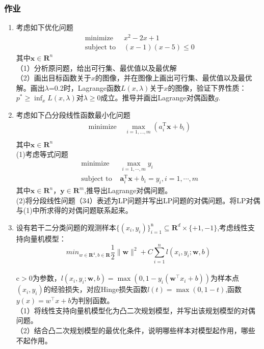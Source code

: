 \documentclass[handout,10pt]{beamer}
\begin{document}
\begin{frame}[allowframebreaks]
  \frametitle{作业}
  
  \begin{enumerate}
  	   \item   考虑如下优化问题
    \begin{equation}
		\begin{array}{ll}
		\text{ minimize }& x^{2}-2x+1\\
		\text { subject to }& (x-1)(x-5)\leqslant0
		\end{array}
	\end{equation}
 其中${\mathbf{x}\in\mathbf{R}^{n}}$\\
（1）分析原问题，给出可行集、最优值以及最优解\\
（2）画出目标函数关于$x$的图像，并在图像上画出可行集、最优值以及最优解。画出${\lambda}$=0.2时，Lagrange函数${L(x,\lambda)}$关于$x$的图像，验证下界性质：${p^*\geqslant\inf_xL(x,\lambda)}$对${\lambda\geqslant0}$成立。推导并画出Lagrange对偶函数$g$.
  	\item 考虑如下凸分段线性函数最小化问题	
   \begin{equation}
		\begin{array}{ll}
		\text{ minimize }&\max_{i=1,\ldots,m}(a_i^\mathrm{T}\boldsymbol{x}+b_i)\\
		\end{array}
	\end{equation}
     其中${\mathbf{x}\in\mathbf{R}^{n}}$\\
(1)考虑等式问题
\begin{equation}
		\begin{array}{ll}
		\text{ minimize }& \max_{i=1,\cdots,m}y_i\\
		\text { subject to }& \boldsymbol{a}_{i}^{\mathrm{T}}\boldsymbol{x}+b_{i}=y_{i},i=1,\cdots,m
		\end{array}
	     \end{equation} 
其中${\mathbf{x}\in\mathbf{R}^{n}}$，${\mathbf{y}\in\mathbf{R}^{m}}$,推导出Lagrange对偶问题。\\

(2)将分段线性问题（34）表述为LP问题并写出LP问题的对偶问题。将LP对偶与(1)中所求得的对偶问题联系起来。 
  	
  	\item 
设有若干二分类问题的观测样本${\{(x_i,y_i)\}_{i=1}^\mathrm{n}\subseteq\mathbf{R}^d\times\{+1,-1\}}$,考虑线性支持向量机模型：\\
\begin{equation}
	min_{w\in\mathbf{R}^{4},b\in\mathbf{R}}\frac{1}{2}\|\boldsymbol{w}\|^{2}+C\sum_{i=1}^{n}l(x_{i},y_{i};\boldsymbol{w},b)
	\end{equation}\\
  ${\mathrm{c}>0}$为参数，${l(x_i,y_i;\boldsymbol{w},b)=\max(0,1-y_i(\boldsymbol{w}^\top x_i+b))}$为样本点${(x_{i},y_{i})}$的经验损失，对应Hinge损失函数${l(t)=\max(0,1-t)}$,函数${y(x)=w^{\top}x+b}$为判别函数。\\
（1）将线性支持向量机模型化为凸二次规划模型，并写出该规划模型的对偶问题。\\
（2）结合凸二次规划模型的最优化条件，说明哪些样本对模型起作用，哪些不起作用。


\end{enumerate}
\end{frame}
\end{document}
